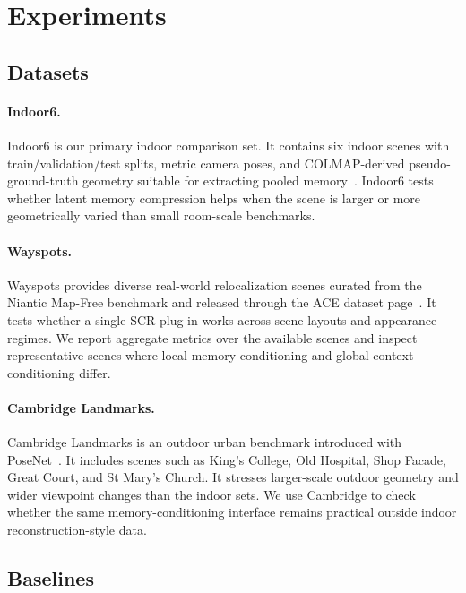 \documentclass[letterpaper]{article} %
\begin{document}
\section{Experiments}

\subsection{Datasets}

\paragraph{Indoor6.}
Indoor6 is our primary indoor comparison set. It contains six indoor scenes with train/validation/test splits, metric camera poses, and COLMAP-derived pseudo-ground-truth geometry suitable for extracting pooled memory~\citep{do2024improved_scene_landmarks,do2022scene_landmarks}. Indoor6 tests whether latent memory compression helps when the scene is larger or more geometrically varied than small room-scale benchmarks.

\paragraph{Wayspots.}
Wayspots provides diverse real-world relocalization scenes curated from the Niantic Map-Free benchmark and released through the ACE dataset page~\citep{arnold2022mapfree,brachmann2023ace}. It tests whether a single SCR plug-in works across scene layouts and appearance regimes. We report aggregate metrics over the available scenes and inspect representative scenes where local memory conditioning and global-context conditioning differ.

\paragraph{Cambridge Landmarks.}
Cambridge Landmarks is an outdoor urban benchmark introduced with PoseNet~\citep{kendall2015posenet}. It includes scenes such as King's College, Old Hospital, Shop Facade, Great Court, and St Mary's Church. It stresses larger-scale outdoor geometry and wider viewpoint changes than the indoor sets. We use Cambridge to check whether the same memory-conditioning interface remains practical outside indoor reconstruction-style data.

\subsection{Baselines}
\end{document}
